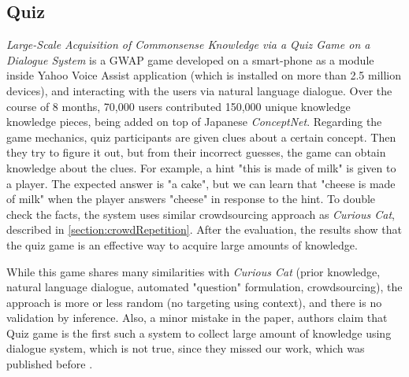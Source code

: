 \subsection{Quiz}
\label{section:r:qiz}
\emph{Large-Scale Acquisition of Commonsense Knowledge via a Quiz Game on a
Dialogue System}\parencite{Otani2016} is a GWAP game developed on a 
smart-phone as a module inside Yahoo Voice Assist application (which is 
installed on more than 2.5 million devices), and interacting with the users 
via natural language dialogue.  Over the course of 8 months, 70,000
users contributed 150,000 unique knowledge knowledge pieces, being added on
top of Japanese \emph{ConceptNet}. Regarding the game mechanics,
quiz participants are given clues about a certain concept. Then they try to
figure it out, but from their incorrect guesses, the game can obtain knowledge 
about the clues. For example, a hint "this is made of milk" is given to a 
player. The expected answer is "a cake", but we can learn that "cheese is made 
of milk" when the player answers "cheese" in response to the hint.
To double check the facts, the system uses similar crowdsourcing approach as 
\emph{Curious Cat}, described in \autoref{section:crowdRepetition}. After
the evaluation, the results show that the quiz game is an effective way
to acquire large amounts of knowledge.

While this game shares many similarities with \emph{Curious Cat} (prior 
knowledge, natural language dialogue, automated "question" formulation,
crowdsourcing), the approach is more or less random (no targeting using context),
and there is no validation by inference. Also, a minor mistake in the paper,
authors claim that Quiz game is the first such a system to collect large amount
of knowledge using dialogue system, which is not true, since they missed our
 work, which was published before \parencite{Bradesko2016}.

